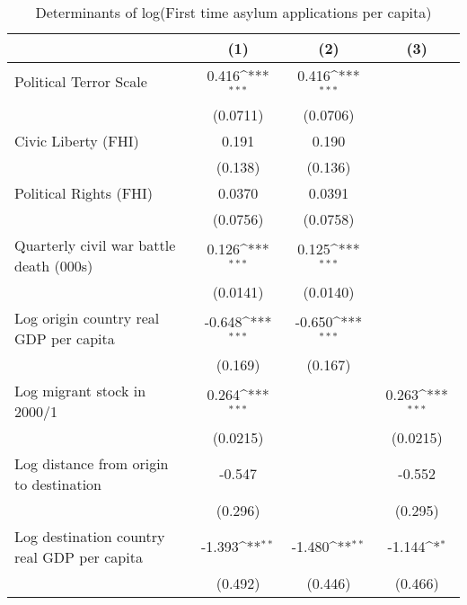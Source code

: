 \begin{table}[htbp]\centering
\def\sym#1{\ifmmode^{#1}\else\(^{#1}\)\fi}
\caption{Determinants of log(First time asylum applications per capita)}
\begin{tabular}{l*{3}{c}}
\hline\hline
                    &\multicolumn{1}{c}{(1)}         &\multicolumn{1}{c}{(2)}         &\multicolumn{1}{c}{(3)}         \\
\hline
Political Terror Scale&       0.416\sym{***}&       0.416\sym{***}&                     \\
                    &    (0.0711)         &    (0.0706)         &                     \\
[1em]
Civic Liberty (FHI) &       0.191         &       0.190         &                     \\
                    &     (0.138)         &     (0.136)         &                     \\
[1em]
Political Rights (FHI)&      0.0370         &      0.0391         &                     \\
                    &    (0.0756)         &    (0.0758)         &                     \\
[1em]
Quarterly civil war battle death (000s)&       0.126\sym{***}&       0.125\sym{***}&                     \\
                    &    (0.0141)         &    (0.0140)         &                     \\
[1em]
Log origin country real GDP per capita&      -0.648\sym{***}&      -0.650\sym{***}&                     \\
                    &     (0.169)         &     (0.167)         &                     \\
[1em]
Log migrant stock in 2000/1&       0.264\sym{***}&                     &       0.263\sym{***}\\
                    &    (0.0215)         &                     &    (0.0215)         \\
[1em]
Log distance from origin to destination&      -0.547         &                     &      -0.552         \\
                    &     (0.296)         &                     &     (0.295)         \\
[1em]
Log destination country real GDP per capita&      -1.393\sym{**} &      -1.480\sym{**} &      -1.144\sym{*}  \\
                    &     (0.492)         &     (0.446)         &     (0.466)         \\

\end{tabular}
\end{table}
